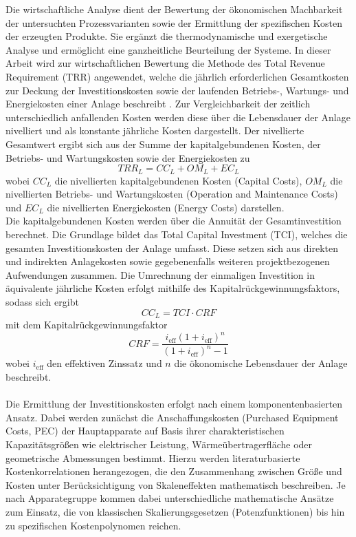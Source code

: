 Die wirtschaftliche Analyse dient der Bewertung der ökonomischen Machbarkeit der untersuchten Prozessvarianten sowie der Ermittlung der spezifischen Kosten der erzeugten Produkte. Sie ergänzt die thermodynamische und exergetische Analyse und ermöglicht eine ganzheitliche Beurteilung der Systeme. In dieser Arbeit wird zur wirtschaftlichen Bewertung die Methode des Total Revenue Requirement (TRR) angewendet, welche die jährlich erforderlichen Gesamtkosten zur Deckung der Investitionskosten sowie der laufenden Betriebs-, Wartungs- und Energiekosten einer Anlage beschreibt \cite{bejanThermalDesignOptimization1996, teschExergybasedMethodsApplied}. Zur Vergleichbarkeit der zeitlich unterschiedlich anfallenden Kosten werden diese über die Lebensdauer der Anlage nivelliert und als konstante jährliche Kosten dargestellt. Der nivellierte Gesamtwert ergibt sich aus der Summe der kapitalgebundenen Kosten, der Betriebs- und Wartungskosten sowie der Energiekosten zu
\begin{equation}
TRR_L = CC_L + OM_L + EC_L
\end{equation}
wobei $CC_L$ die nivellierten kapitalgebundenen Kosten
(Capital Costs), $OM_L$ die nivellierten Betriebs- und
Wartungskosten (Operation and Maintenance Costs) und $EC_L$
die nivellierten Energiekosten (Energy Costs) darstellen.\\
Die kapitalgebundenen Kosten werden über die Annuität der Gesamtinvestition berechnet. Die Grundlage bildet das Total Capital Investment (TCI), welches die gesamten Investitionskosten der Anlage umfasst. Diese setzen sich aus direkten und indirekten Anlagekosten sowie gegebenenfalls weiteren projektbezogenen Aufwendungen zusammen. Die Umrechnung der einmaligen Investition in äquivalente jährliche Kosten erfolgt mithilfe des Kapitalrückgewinnungsfaktors, sodass sich ergibt
\begin{equation}
CC_L = TCI \cdot CRF
\end{equation}
mit dem Kapitalrückgewinnungsfaktor
\begin{equation}
CRF = \frac{i_\mathrm{eff} (1+i_\mathrm{eff})^n}{(1+i_\mathrm{eff})^n - 1}
\end{equation}
wobei $i_\mathrm{eff}$ den effektiven Zinssatz und $n$ die ökonomische Lebensdauer der Anlage beschreibt. \cite{bejanThermalDesignOptimization1996}\\
\\
Die Ermittlung der Investitionskosten erfolgt nach einem komponentenbasierten Ansatz. Dabei werden zunächst die Anschaffungskosten (Purchased Equipment Costs, PEC) der Hauptapparate auf Basis ihrer charakteristischen Kapazitätsgrößen wie elektrischer Leistung, Wärmeübertragerfläche oder geometrische Abmessungen bestimmt. Hierzu werden literaturbasierte Kostenkorrelationen herangezogen, die den Zusammenhang zwischen Größe und Kosten unter Berücksichtigung von Skaleneffekten mathematisch beschreiben. Je nach Apparategruppe kommen dabei unterschiedliche mathematische Ansätze zum Einsatz, die von klassischen Skalierungsgesetzen (Potenzfunktionen) bis hin zu spezifischen Kostenpolynomen reichen.\\
